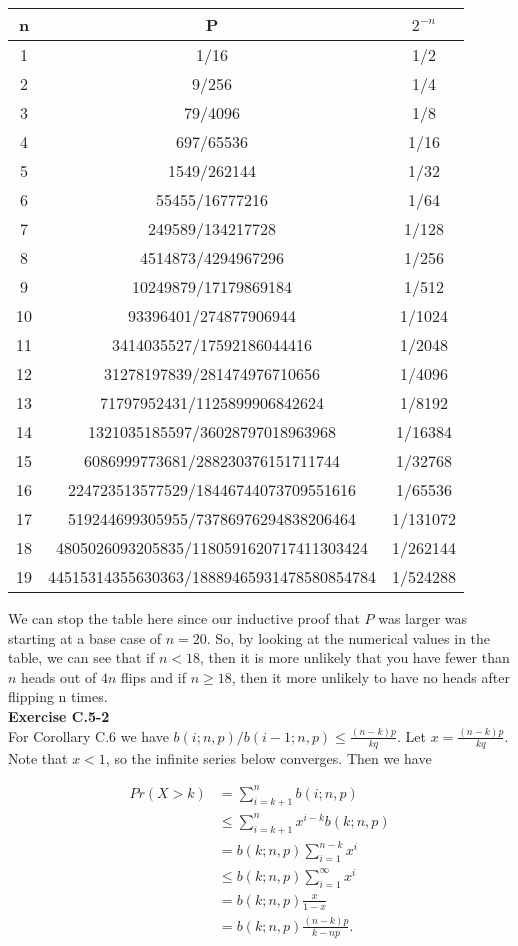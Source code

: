 \documentclass{article}
\begin{document}
\begin{center}
\begin{tabular}{|c|c|c|}
\hline
n&P&$2^{-n}$\\
\hline
1&1/16& 1/2\\
2&9/256& 1/4\\
3&79/4096& 1/8\\
4&697/65536& 1/16\\
5&1549/262144& 1/32\\
6&55455/16777216& 1/64\\
7&249589/134217728& 1/128\\
8&4514873/4294967296& 1/256\\
9&10249879/17179869184& 1/512\\
10&93396401/274877906944& 1/1024\\
11&3414035527/17592186044416& 1/2048\\
12&31278197839/281474976710656& 1/4096\\
13&71797952431/1125899906842624& 1/8192\\
14&1321035185597/36028797018963968& 1/16384\\
15&6086999773681/288230376151711744& 1/32768\\
16&224723513577529/18446744073709551616& 1/65536\\
17&519244699305955/73786976294838206464& 1/131072\\
18&4805026093205835/1180591620717411303424& 1/262144\\
19&44515314355630363/18889465931478580854784& 1/524288\\
\hline
\end{tabular}
\end{center}

We can stop the table here since our inductive proof that $P$ was larger was starting at a base case of $n=20$. So, by looking at the numerical values in the table, we can see that if $n<18$, then it is more unlikely that you have fewer than $n$ heads out of $4n$ flips and if $n\ge 18$, then it more unlikely to have no heads after flipping n times.\\

\noindent\textbf{Exercise C.5-2}\\

For Corollary C.6 we have $b(i;n,p)/b(i-1;n,p) \leq \frac{(n-k)p}{kq}$.  Let $x = \frac{(n-k)p}{kq}$.  Note that $x < 1$, so the infinite series below converges. Then we have

\begin{align*}
Pr(X > k) &= \sum_{i=k+1}^n b(i;n,p) \\
&\leq \sum_{i=k+1}^n x^{i-k}b(k;n,p) \\
&= b(k;n,p) \sum_{i=1}^{n-k} x^i \\
&\leq b(k;n,p) \sum_{i=1}^\infty x^i \\
&= b(k;n,p) \frac{x}{1-x} \\
&= b(k;n,p) \frac{(n-k)p}{k-np}.
\end{align*}
\end{document}
